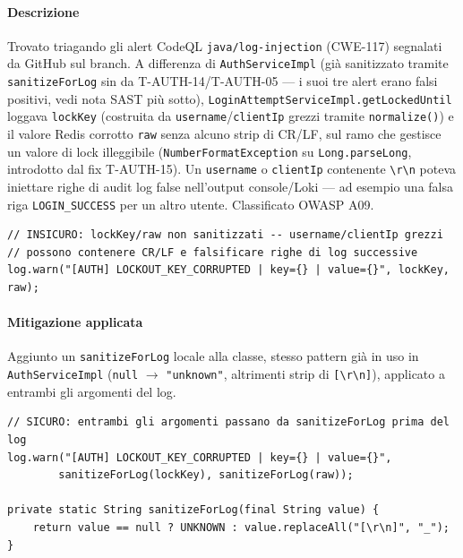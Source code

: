 ﻿\documentclass[a4paper,12pt]{report}
\begin{document}
\paragraph{Descrizione}
Trovato triagando gli alert CodeQL \texttt{java/log-injection} (CWE-117)
segnalati da GitHub sul branch. A differenza di \texttt{AuthServiceImpl}
(già sanitizzato tramite \texttt{sanitizeForLog} sin da T-AUTH-14/T-AUTH-05
--- i suoi tre alert erano falsi positivi, vedi nota SAST più sotto),
\texttt{LoginAttemptServiceImpl.getLockedUntil} loggava \texttt{lockKey}
(costruita da \texttt{username}/\texttt{clientIp} grezzi tramite
\texttt{normalize()}) e il valore Redis corrotto \texttt{raw} senza alcuno
strip di CR/LF, sul ramo che gestisce un valore di lock illeggibile
(\texttt{NumberFormatException} su \texttt{Long.parseLong}, introdotto dal
fix T-AUTH-15). Un \texttt{username} o \texttt{clientIp} contenente
\texttt{\textbackslash r\textbackslash n} poteva iniettare righe di audit
log false nell'output console/Loki --- ad esempio una falsa riga
\texttt{LOGIN\_SUCCESS} per un altro utente. Classificato OWASP A09.

\begin{insecurebox}[title={Codice Vulnerabile --- LoginAttemptServiceImpl.java (baseline)}]
\begin{lstlisting}[style=java]
// INSICURO: lockKey/raw non sanitizzati -- username/clientIp grezzi
// possono contenere CR/LF e falsificare righe di log successive
log.warn("[AUTH] LOCKOUT_KEY_CORRUPTED | key={} | value={}", lockKey, raw);
\end{lstlisting}
\end{insecurebox}

\paragraph{Mitigazione applicata}
Aggiunto un \texttt{sanitizeForLog} locale alla classe, stesso pattern già
in uso in \texttt{AuthServiceImpl} (\texttt{null} $\to$ \texttt{"unknown"},
altrimenti strip di \texttt{[\textbackslash r\textbackslash n]}), applicato
a entrambi gli argomenti del log.

\begin{securebox}[title={Codice Sicuro --- LoginAttemptServiceImpl.java (fix)}]
\begin{lstlisting}[style=java]
// SICURO: entrambi gli argomenti passano da sanitizeForLog prima del log
log.warn("[AUTH] LOCKOUT_KEY_CORRUPTED | key={} | value={}",
        sanitizeForLog(lockKey), sanitizeForLog(raw));

private static String sanitizeForLog(final String value) {
    return value == null ? UNKNOWN : value.replaceAll("[\r\n]", "_");
}
\end{lstlisting}
\end{securebox}
\end{document}
